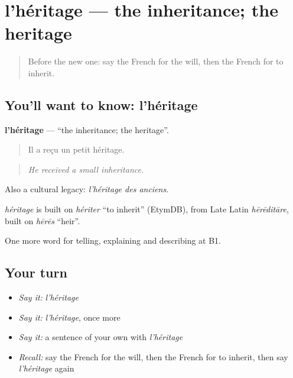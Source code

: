 \section[l'héritage]{l'héritage — the inheritance; the heritage}

\label{lesson:FR-C315-heritage}



\begin{quote}
Before the new one: say the French for the will, then the French for to inherit.
\end{quote}

\subsection*{You'll want to know: l'héritage}
\textbf{l'héritage} — \textquotedblleft{}the inheritance; the heritage\textquotedblright{}.

\begin{quote}
Il a reçu un petit héritage.
\end{quote}

\begin{quote}
\emph{He received a small inheritance.}
\end{quote}

Also a cultural legacy: \emph{l'héritage des anciens}.

\begin{cousinweb}
\emph{héritage} is built on \emph{hériter} \textquotedblleft{}to inherit\textquotedblright{} (EtymDB), from Late Latin \emph{hērēditāre}, built on \emph{hērēs} \textquotedblleft{}heir\textquotedblright{}.
\end{cousinweb}

\begin{grammarlens}[title={What you've built}]
One more word for telling, explaining and describing at B1.
\end{grammarlens}

\subsection*{Your turn}
\begin{itemize}
\raggedright
  \item \emph{Say it:} \emph{l'héritage}
  \item \emph{Say it:} \emph{l'héritage}, once more
  \item \emph{Say it:} a sentence of your own with \emph{l'héritage}
  \item \emph{Recall:} say the French for the will, then the French for to inherit, then say \emph{l'héritage} again
\end{itemize}

